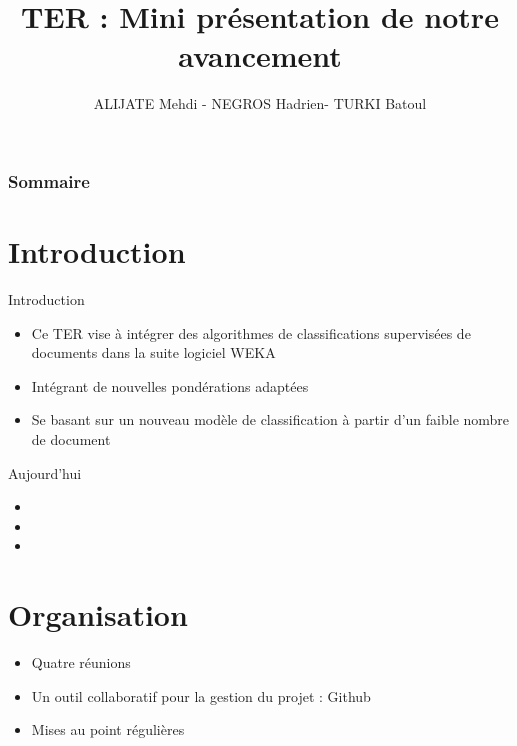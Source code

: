 \documentclass[12pt]{beamer}
\author{ALIJATE Mehdi -  NEGROS Hadrien- TURKI Batoul}
\title{TER :  Mini présentation de notre avancement}
\begin{document}
\begin{frame}
\titlepage 


\end{frame}


\begin{frame}
\tableofcontents
\frametitle{Sommaire}


\end{frame}

\section{Introduction}

\begin{frame}
\begin{block}{Introduction}
\begin{itemize}
\item Ce TER vise à intégrer des algorithmes de classifications supervisées de documents dans la suite logiciel WEKA 
\item Intégrant de nouvelles pondérations adaptées
\item Se basant sur un nouveau modèle de classification à partir d’un faible nombre de document
\end{itemize} 
\end{block}

\begin{block}{Aujourd'hui}
\begin{itemize}
\item 
\item 
\item 
\end{itemize}
\end{block}

\end{frame}

\section{Organisation}
\begin{frame}
\begin{itemize}
	\item Quatre réunions
	\item Un outil collaboratif pour la gestion du projet : Github
	\item Mises au point régulières
\end{itemize}
\end{frame}
\end{document}
